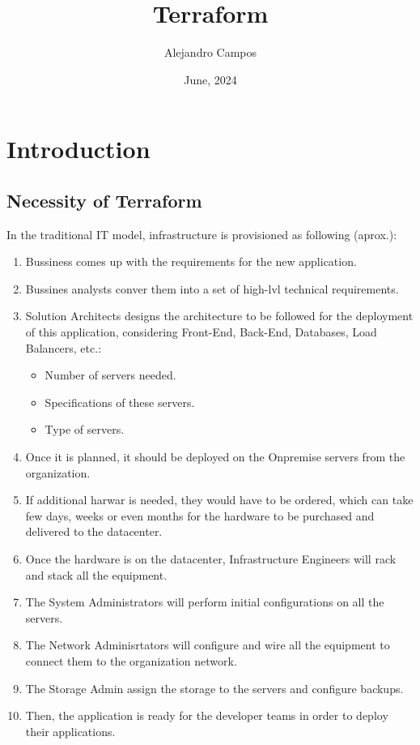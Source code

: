 \documentclass{article}
\title{\textbf{Terraform}}
\author{Alejandro Campos}
\date{June, 2024}
\begin{document}
\maketitle
\newpage
\tableofcontents

\newpage
\section{Introduction}
\subsection{Necessity of Terraform}
In the traditional IT model, infrastructure is provisioned as following (aprox.):
\begin{enumerate}
    \item Bussiness comes up with the requirements for the new application.
    \item Bussines analysts conver them into a set of high-lvl technical requirements.
    \item Solution Architects designs the architecture to be followed for the deployment of this application, considering Front-End, Back-End, Databases, Load Balancers, etc.:
    \begin{itemize}
        \item Number of servers needed.
        \item Specifications of these servers.
        \item Type of servers.
    \end{itemize}
    \item Once it is planned, it should be deployed on the Onpremise servers from the organization.
    \item If additional harwar is needed, they would have to be ordered, which can take few days, weeks or even months for the hardware to be purchased and delivered to the datacenter.
    \item Once the hardware is on the datacenter, Infrastructure Engineers will rack and stack all the equipment.
    \item The System Administrators will perform initial configurations on all the servers.
    \item The Network Adminisrtators will configure and wire all the equipment to connect them to the organization network.
    \item The Storage Admin assign the storage to the servers and configure backups.
    \item Then, the application is ready for the developer teams in order to deploy their applications.
\end{enumerate}
\end{document}
